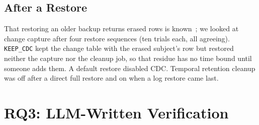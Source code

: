 \documentclass[runningheads]{llncs}
\begin{document}
\subsection{After a Restore}

That restoring an older backup returns erased rows is known~\cite{lenard2024};
we looked at change capture after four restore sequences (ten trials each, all
agreeing). \texttt{KEEP\_CDC} kept the change table with the erased subject's
row but restored neither the capture nor the cleanup job, so that residue has no
time bound until someone adds them. A default restore disabled CDC. Temporal
retention cleanup was off after a direct full restore and on when a log restore
came last.

\section{RQ3: LLM-Written Verification}\label{sec:rq3}
\end{document}
